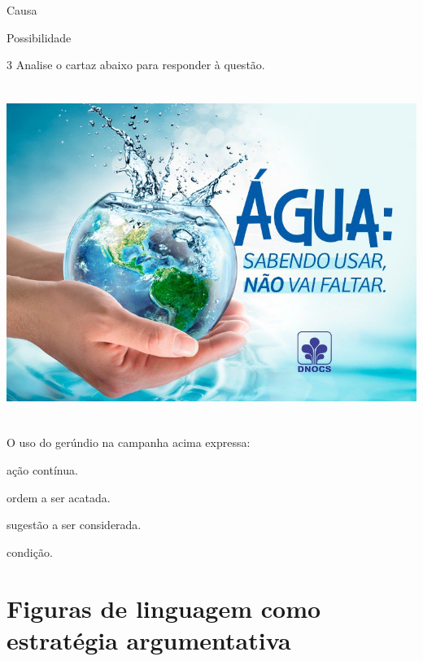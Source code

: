 {\begin{escolha}
  \item Causa
  
  \item Possibilidade

\end{escolha}


\num{3} Analise o cartaz abaixo para responder à questão.

\includegraphics[width=5.90551in,height=4.29167in]{./imgSAEB_7_POR/media/image13.png}


O uso do gerúndio na campanha acima expressa:

\begin{escolha}

  \item ação contínua.
  \item ordem a ser acatada.
  \item sugestão a ser considerada.
  \item condição.

\end{escolha}


\chapter{Figuras de linguagem como estratégia argumentativa}

}
